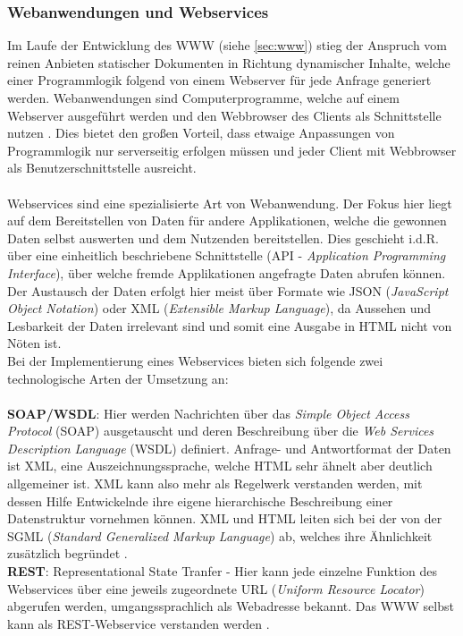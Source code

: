 \subsubsection{Webanwendungen und Webservices}\label{sec:webanwenservices}
Im Laufe der Entwicklung des WWW (siehe \ref{sec:www}) stieg der Anspruch vom reinen Anbieten statischer Dokumenten in Richtung dynamischer Inhalte, welche einer Programmlogik folgend von einem Webserver für jede Anfrage generiert werden. Web\-anwendungen sind Computerprogramme, welche auf einem Webserver ausgeführt werden und den Webbrowser des Clients als Schnittstelle nutzen \cite{Safran2011}. Dies bietet den großen Vorteil, dass etwaige Anpassungen von Programmlogik nur serverseitig erfolgen müssen und jeder Client mit Webbrowser als Benutzerschnittstelle ausreicht. \\ \\
Webservices sind eine spezialisierte Art von Webanwendung. Der Fokus hier liegt auf dem Bereitstellen von Daten für andere Applikationen, welche die gewonnen Daten selbst auswerten und dem Nutzenden bereitstellen. Dies geschieht i.d.R. über eine einheitlich beschriebene Schnittstelle (API - \emph{Application Programming Interface}), über welche fremde Applikationen angefragte Daten abrufen können. Der Austausch der Daten erfolgt hier meist über Formate wie JSON (\emph{JavaScript Object Notation}) oder XML (\emph{Extensible Markup Language}), da Aussehen und Lesbarkeit der Daten irrelevant sind und somit eine Ausgabe in HTML nicht von Nöten ist. \\
Bei der Implementierung eines Webservices bieten sich folgende zwei technologische Arten der Umsetzung an: \\ \\
\textbf{SOAP/WSDL}: Hier werden Nachrichten über das \emph{Simple Object Access Protocol} (SOAP) ausgetauscht und deren Beschreibung über die \emph{Web Services Description Language} (WSDL) definiert. Anfrage- und Antwortformat der Daten ist XML, eine Auszeichnungssprache, welche HTML sehr ähnelt aber deutlich allgemeiner ist. XML kann also mehr als Regelwerk verstanden werden, mit dessen Hilfe Entwickelnde ihre eigene hierarchische Beschreibung einer Datenstruktur vornehmen können. XML und HTML leiten sich bei der von der SGML (\emph{Standard Generalized Markup Language}) ab, welches ihre Ähnlichkeit zusätzlich begründet \cite{XMLHTMLU88:online}. \\

 
\textbf{REST}: Representational State Tranfer - Hier kann jede einzelne Funktion des Webservices über eine jeweils zugeordnete URL (\emph{Uniform Resource Locator}) abgerufen werden, umgangssprachlich als Webadresse bekannt. Das WWW selbst kann als REST-Webservice verstanden werden \cite{Bayer2002:online}. \\ 

